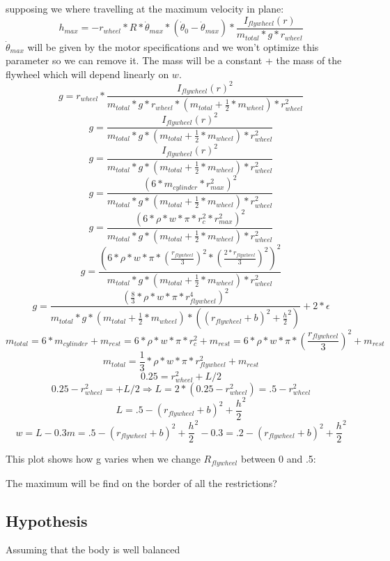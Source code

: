supposing we where travelling at the maximum velocity in plane:
\[h_{max}= - r_{wheel} * R * \dot{\theta}_{max} * (\dot{\theta}_0-\dot{\theta}_{max}) * \frac{I_{flywheel}(r)}{m_{total} * g * r_{wheel}}\]
$\dot{\theta}_{max}$ will be given by the motor specifications and we won't optimize this parameter so we can remove it.
The mass will be a constant + the mass of the flywheel which will depend linearly on $w$.
\[g= r_{wheel} * \frac{I_{flywheel}(r)^2}{m_{total} * g * r_{wheel}*(m_{total} + \frac{1}{2} *m_{wheel}) * r_{wheel}^2}\]
\[g= \frac{I_{flywheel}(r)^2}{m_{total} * g * (m_{total} + \frac{1}{2} *m_{wheel}) * r_{wheel}^2}\]
\[g= \frac{I_{flywheel}(r)^2}{m_{total} * g * (m_{total} + \frac{1}{2} *m_{wheel}) * r_{wheel}^2}\]
\[g= \frac{(6 * m_{cylinder} * r_{max}^2)^2}{m_{total} * g * (m_{total} + \frac{1}{2} *m_{wheel}) * r_{wheel}^2}\]
\[g= \frac{(6 * \rho * w * \pi * r_c^2* r_{max}^2)^2}{m_{total} * g * (m_{total} + \frac{1}{2} *m_{wheel}) * r_{wheel}^2}\]
\[g= \frac{(6 * \rho * w * \pi * (\frac{r_{flywheel}}{3})^2* (\frac{2*r_{flywheel}}{3})^2)^2}{m_{total} * g * (m_{total} + \frac{1}{2} *m_{wheel}) * r_{wheel}^2}\]
\[g= \frac{(\frac{8}{3} * \rho * w * \pi * r_{flywheel}^4)^2}{m_{total} * g * (m_{total} + \frac{1}{2} *m_{wheel}) * ((r_{flywheel} + b)^2+\frac{h}{2}^2)} + 2*\epsilon\]
\[m_{total} =6* m_{cylinder}+m_{rest} = 6 * \rho * w * \pi * r_c^2 + m_{rest} = 6 * \rho * w * \pi * (\frac{r_{flywheel}}{3})^2 + m_{rest} \]
\[m_{total} =\frac{1}{3} * \rho * w * \pi * r_{flywheel}^2 + m_{rest} \]
\[0.25 = r_{wheel}^2 + L/2\]
\[0.25 - r_{wheel}^2 =  + L/2 \Rightarrow L=2*(0.25-r_{wheel}^2) = .5-r_{wheel}^2\]
\[ L = .5-(r_{flywheel} + b)^2+\frac{h}{2}^2 \]
\[w = L - 0.3m = .5-(r_{flywheel} + b)^2+\frac{h}{2}^2 -0.3 = .2-(r_{flywheel} + b)^2+\frac{h}{2}^2\]

This plot shows how g varies when we change $R_{flywheel}$ between 0 and .5:


The maximum will be find on the border of all the restrictions?
\fi




\subsection{Hypothesis}
Assuming that the body is well balanced
